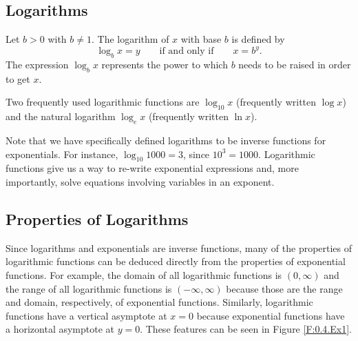 

\subsection*{Logarithms}

\begin{definition}[logarithm]
Let $b>0$ with $b\neq1$. The logarithm of $x$ with base $b$ is defined by
	\[
		\log_{b}x=y\qquad\mbox{if and only if}\qquad x=b^{y}.
	\]
The expression $\log_{b}x$ represents the power to which $b$ needs to be raised in order to get $x$.

Two frequently used logarithmic functions are $\log_{10}x$ (frequently written $\log x$) and the natural logarithm $\log_{e}x$ (frequently written $\ln x$).
\end{definition}

Note that we have specifically defined logarithms to be inverse functions for
exponentials. For instance, $\log_{10}{1000} = 3$, since $10^{3} = 1000$.  Logarithmic
functions give us a way to re-write exponential expressions and, more importantly, solve
equations involving variables in an exponent.

\subsection*{Properties of Logarithms}
Since logarithms and exponentials are inverse functions, many of the properties of
logarithmic functions can be deduced directly from the properties of exponential
functions.  For example, the domain of all logarithmic functions is $(0,\infty)$ and the
range of all logarithmic functions is $(-\infty,\infty)$ because those are the range and
domain, respectively, of exponential functions.  Similarly, logarithmic functions have a
vertical asymptote at $x = 0$ because exponential functions have a horizontal asymptote at
$y = 0$. These features can be seen in Figure \ref{F:0.4.Ex1}. 

